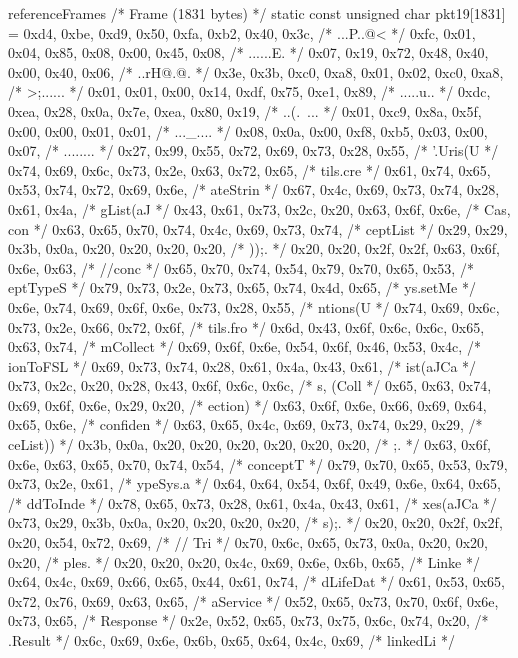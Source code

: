 \begin{chunk}{referenceFrames}
{{{{/* Frame (1831 bytes) */
static const unsigned char pkt19[1831] = {
0xd4, 0xbe, 0xd9, 0x50, 0xfa, 0xb2, 0x40, 0x3c, /* ...P..@< */
0xfc, 0x01, 0x04, 0x85, 0x08, 0x00, 0x45, 0x08, /* ......E. */
0x07, 0x19, 0x72, 0x48, 0x40, 0x00, 0x40, 0x06, /* ..rH@.@. */
0x3e, 0x3b, 0xc0, 0xa8, 0x01, 0x02, 0xc0, 0xa8, /* >;...... */
0x01, 0x01, 0x00, 0x14, 0xdf, 0x75, 0xe1, 0x89, /* .....u.. */
0xdc, 0xea, 0x28, 0x0a, 0x7e, 0xea, 0x80, 0x19, /* ..(.~... */
0x01, 0xc9, 0x8a, 0x5f, 0x00, 0x00, 0x01, 0x01, /* ..._.... */
0x08, 0x0a, 0x00, 0xf8, 0xb5, 0x03, 0x00, 0x07, /* ........ */
0x27, 0x99, 0x55, 0x72, 0x69, 0x73, 0x28, 0x55, /* '.Uris(U */
0x74, 0x69, 0x6c, 0x73, 0x2e, 0x63, 0x72, 0x65, /* tils.cre */
0x61, 0x74, 0x65, 0x53, 0x74, 0x72, 0x69, 0x6e, /* ateStrin */
0x67, 0x4c, 0x69, 0x73, 0x74, 0x28, 0x61, 0x4a, /* gList(aJ */
0x43, 0x61, 0x73, 0x2c, 0x20, 0x63, 0x6f, 0x6e, /* Cas, con */
0x63, 0x65, 0x70, 0x74, 0x4c, 0x69, 0x73, 0x74, /* ceptList */
0x29, 0x29, 0x3b, 0x0a, 0x20, 0x20, 0x20, 0x20, /* ));.     */
0x20, 0x20, 0x2f, 0x2f, 0x63, 0x6f, 0x6e, 0x63, /*   //conc */
0x65, 0x70, 0x74, 0x54, 0x79, 0x70, 0x65, 0x53, /* eptTypeS */
0x79, 0x73, 0x2e, 0x73, 0x65, 0x74, 0x4d, 0x65, /* ys.setMe */
0x6e, 0x74, 0x69, 0x6f, 0x6e, 0x73, 0x28, 0x55, /* ntions(U */
0x74, 0x69, 0x6c, 0x73, 0x2e, 0x66, 0x72, 0x6f, /* tils.fro */
0x6d, 0x43, 0x6f, 0x6c, 0x6c, 0x65, 0x63, 0x74, /* mCollect */
0x69, 0x6f, 0x6e, 0x54, 0x6f, 0x46, 0x53, 0x4c, /* ionToFSL */
0x69, 0x73, 0x74, 0x28, 0x61, 0x4a, 0x43, 0x61, /* ist(aJCa */
0x73, 0x2c, 0x20, 0x28, 0x43, 0x6f, 0x6c, 0x6c, /* s, (Coll */
0x65, 0x63, 0x74, 0x69, 0x6f, 0x6e, 0x29, 0x20, /* ection)  */
0x63, 0x6f, 0x6e, 0x66, 0x69, 0x64, 0x65, 0x6e, /* confiden */
0x63, 0x65, 0x4c, 0x69, 0x73, 0x74, 0x29, 0x29, /* ceList)) */
0x3b, 0x0a, 0x20, 0x20, 0x20, 0x20, 0x20, 0x20, /* ;.       */
0x63, 0x6f, 0x6e, 0x63, 0x65, 0x70, 0x74, 0x54, /* conceptT */
0x79, 0x70, 0x65, 0x53, 0x79, 0x73, 0x2e, 0x61, /* ypeSys.a */
0x64, 0x64, 0x54, 0x6f, 0x49, 0x6e, 0x64, 0x65, /* ddToInde */
0x78, 0x65, 0x73, 0x28, 0x61, 0x4a, 0x43, 0x61, /* xes(aJCa */
0x73, 0x29, 0x3b, 0x0a, 0x20, 0x20, 0x20, 0x20, /* s);.     */
0x20, 0x20, 0x2f, 0x2f, 0x20, 0x54, 0x72, 0x69, /*   // Tri */
0x70, 0x6c, 0x65, 0x73, 0x0a, 0x20, 0x20, 0x20, /* ples.    */
0x20, 0x20, 0x20, 0x4c, 0x69, 0x6e, 0x6b, 0x65, /*    Linke */
0x64, 0x4c, 0x69, 0x66, 0x65, 0x44, 0x61, 0x74, /* dLifeDat */
0x61, 0x53, 0x65, 0x72, 0x76, 0x69, 0x63, 0x65, /* aService */
0x52, 0x65, 0x73, 0x70, 0x6f, 0x6e, 0x73, 0x65, /* Response */
0x2e, 0x52, 0x65, 0x73, 0x75, 0x6c, 0x74, 0x20, /* .Result  */
0x6c, 0x69, 0x6e, 0x6b, 0x65, 0x64, 0x4c, 0x69, /* linkedLi */
}}}}}
\end{chunk}
